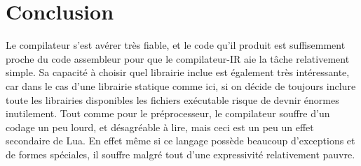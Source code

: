 \documentclass{article}
\begin{document}
\section{Conclusion}
Le compilateur s'est avérer très fiable, et le code qu'il produit est suffisemment proche du code assembleur pour que le compilateur-IR aie la tâche relativement simple. Sa capacité à choisir quel librairie inclue est également très intéressante, car dans le cas d'une librairie statique comme ici, si on décide de toujours inclure toute les librairies disponibles les fichiers exécutable risque de devnir énormes inutilement. Tout comme pour le préprocesseur, le compilateur souffre d'un codage un peu lourd, et désagréable à lire, mais ceci est un peu un effet secondaire de Lua. En effet même si ce langage possède beaucoup d'exceptions et de formes spéciales, il souffre malgré tout d'une expressivité relativement pauvre. 
\end{document}
